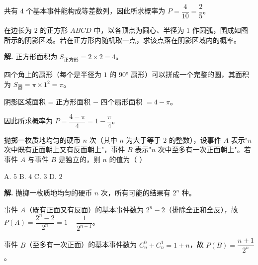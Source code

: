 \documentclass[11pt]{ctexrep}
\begin{document}
共有 $4$ 个基本事件能构成等差数列，因此所求概率为 $P = \dfrac{4}{10} = \dfrac{2}{5}$。

\begin{example}
    在边长为 $2$ 的正方形 $ABCD$ 中，以各顶点为圆心、半径为 $1$ 作圆弧，围成如图所示的阴影区域。若在正方形内随机取一点，求该点落在阴影区域内的概率。

    \begin{center}
    \end{center}
\end{example}

\textbf{解.} 正方形面积为 $S_{\text{正方形}} = 2 \times 2 = 4$。

四个角上的扇形（每个是半径为 $1$ 的 $90°$ 扇形）可以拼成一个完整的圆，其面积为 $S_{\text{圆}} = \pi \times 1^2 = \pi$。

阴影区域面积 = 正方形面积 $-$ 四个扇形面积 $= 4 - \pi$。

因此所求概率为 $P = \dfrac{4 - \pi}{4} = 1 - \dfrac{\pi}{4}$。

\begin{realexam}[2025 上海高三二模]
    抛掷一枚质地均匀的硬币 $n$ 次（其中 $n$ 为大于等于 $2$ 的整数），设事件 $A$ 表示"$n$ 次中既有正面朝上又有反面朝上"，事件 $B$ 表示"$n$ 次中至多有一次正面朝上"。若事件 $A$ 与事件 $B$ 是独立的，则 $n$ 的值为（ ）

    A. $5$ \quad B. $4$ \quad C. $3$ \quad D. $2$
\end{realexam}

\textbf{解.} 抛掷一枚质地均匀的硬币 $n$ 次，所有可能的结果有 $2^n$ 种。

事件 $A$（既有正面又有反面）的基本事件数为 $2^n - 2$（排除全正和全反），故 $P(A) = \dfrac{2^n - 2}{2^n} = 1 - \dfrac{1}{2^{n-1}}$。

事件 $B$（至多有一次正面）的基本事件数为 $C_n^0 + C_n^1 = 1 + n$，故 $P(B) = \dfrac{n + 1}{2^n}$。
\end{document}
